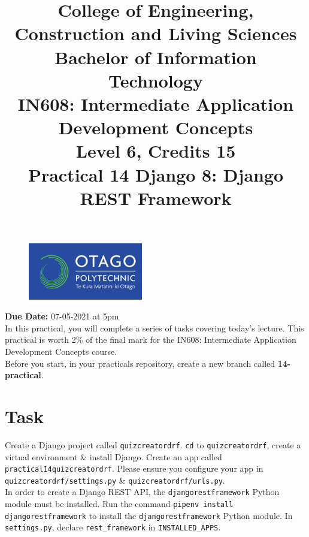 \documentclass{article}
\author{}
\begin{document}
\begin{figure}
	\centering
	\includegraphics[width=50mm]{./img/logo.png}
\end{figure}

\title{College of Engineering, Construction and Living Sciences\\Bachelor of Information Technology\\IN608: Intermediate Application Development Concepts\\Level 6, Credits 15\\\textbf{Practical 14 Django 8: Django REST Framework}} 
\date{}
\maketitle

\textbf{Due Date:} 07-05-2021 at 5pm \\

In this practical, you will complete a series of tasks covering today's lecture. This practical is worth 2\% of the final mark for the IN608: Intermediate Application Development Concepts course. \\

Before you start, in your practicals repository, create a new branch called \textbf{14-practical}.

\section*{Task} 
Create a Django project called \texttt{quizcreatordrf}. \texttt{cd} to \texttt{quizcreatordrf}, create a virtual environment \& install Django. Create an app called \texttt{practical14quizcreatordrf}. Please ensure you configure your app in \texttt{quizcreatordrf/settings.py} \& \texttt{quizcreatordrf/urls.py}. \\

In order to create a Django REST API, the \texttt{djangorestframework} Python module must be installed. Run the command \texttt{pipenv install djangorestframework} to install the \texttt{djangorestframework} Python module. In \texttt{settings.py}, declare \texttt{rest\_framework} in \texttt{INSTALLED\_APPS}. \\
\end{document}
